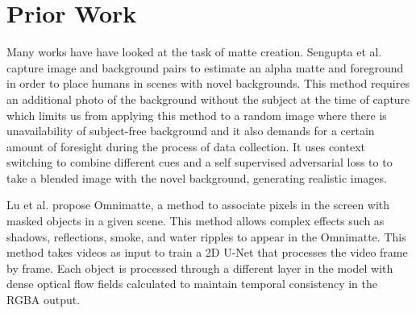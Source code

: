 \documentclass{article}
\begin{document}



\section{Prior Work}
Many works have have looked at the task of matte creation. Sengupta et al. \cite{BMSengupta20} capture image and background pairs to estimate an alpha matte and foreground in order to place humans in scenes with novel backgrounds. This method requires an additional photo of the background without the subject at the time of capture which limits us from applying this method to a random image where there is unavailability of subject-free background and it also demands for a certain amount of foresight during the process of data collection. It uses context switching to combine different cues and a self supervised adversarial loss to to take a blended image with the novel background, generating realistic images.

Lu et al. \cite{lu2021} propose Omnimatte, a method to associate pixels in the screen with masked objects in a given scene. This method allows complex effects such as shadows, reflections, smoke, and water ripples to appear in the Omnimatte. This method takes videos as input to train a 2D U-Net that processes the video frame by frame. Each object is processed through a different layer in the model with dense optical flow fields calculated to maintain temporal consistency in the RGBA output.
\end{document}
